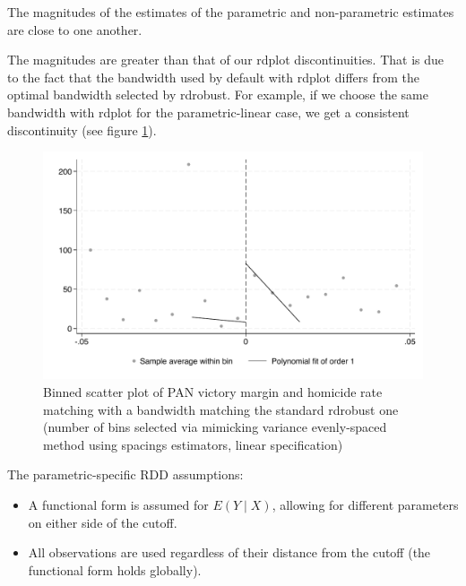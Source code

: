 \documentclass{article}
\begin{document}
The magnitudes of the estimates of the parametric and non-parametric estimates are close to one another.

The magnitudes are greater than that of our rdplot discontinuities. That is due to the fact that the bandwidth used by default with rdplot differs from the optimal bandwidth selected by rdrobust. For example, if we choose the same bandwidth with rdplot for the parametric-linear case, we get a consistent discontinuity (see figure \ref{fig:binned_scatter_esmv_linear_corrected}).

\begin{figure}[H]
    \centering
    \includegraphics[scale=0.5]{../outputs/binned_scatter_esmv_linear_plot_corrected.pdf}
    \caption{Binned scatter plot of PAN victory margin and homicide rate matching with a bandwidth matching the standard rdrobust one (number of bins selected via mimicking variance evenly-spaced method using spacings estimators, linear specification)}
    \label{fig:binned_scatter_esmv_linear_corrected}
\end{figure}

The parametric-specific RDD assumptions:
\begin{itemize}
    \item A functional form is assumed for \(E(Y \mid X)\), allowing for different parameters on either side of the cutoff.
    \item All observations are used regardless of their distance from the cutoff (the functional form holds globally).
\end{itemize}
\end{document}
